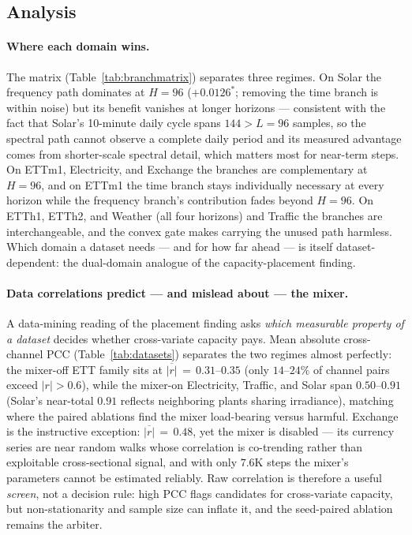 \documentclass[runningheads]{llncs}
\begin{document}
\subsection{Analysis}

\paragraph{Where each domain wins.} The matrix
(Table~\ref{tab:branchmatrix}) separates three regimes. On Solar the
frequency path dominates at $H{=}96$ ($+0.0126^{*}$; removing the time
branch is within noise) but its benefit vanishes at longer horizons ---
consistent with the fact that Solar's 10-minute daily cycle spans
$144{>}L{=}96$ samples, so the spectral path cannot observe a complete
daily period and its measured advantage comes from shorter-scale spectral
detail, which matters most for near-term steps. On ETTm1, Electricity, and
Exchange the branches are complementary at $H{=}96$, and on ETTm1 the time
branch stays individually necessary at every horizon while the frequency
branch's contribution fades beyond $H{=}96$. On ETTh1, ETTh2, and Weather
(all four horizons) and Traffic the branches are interchangeable, and the
convex gate makes carrying the unused path harmless. Which domain a
dataset needs --- and for how far ahead --- is itself dataset-dependent:
the dual-domain analogue of the capacity-placement finding.

\paragraph{Data correlations predict --- and mislead about --- the mixer.}
A data-mining reading of the placement finding asks \emph{which measurable
property of a dataset} decides whether cross-variate capacity pays. Mean
absolute cross-channel PCC (Table~\ref{tab:datasets}) separates the two
regimes almost perfectly: the mixer-off ETT family sits at
$\overline{|r|}\,{=}\,0.31$--$0.35$ (only $14$--$24\%$ of channel pairs
exceed $|r|{>}0.6$), while the mixer-on Electricity, Traffic, and Solar
span $0.50$--$0.91$ (Solar's near-total $0.91$ reflects neighboring plants
sharing irradiance), matching where the paired ablations find the mixer
load-bearing versus harmful. Exchange is the instructive exception:
$\overline{|r|}\,{=}\,0.48$, yet the mixer is disabled --- its currency
series are near random walks whose correlation is co-trending rather than
exploitable cross-sectional signal, and with only $7.6$K steps the mixer's
parameters cannot be estimated reliably. Raw correlation is therefore a
useful \emph{screen}, not a decision rule: high PCC flags candidates for
cross-variate capacity, but non-stationarity and sample size can inflate
it, and the seed-paired ablation remains the arbiter.
\end{document}
